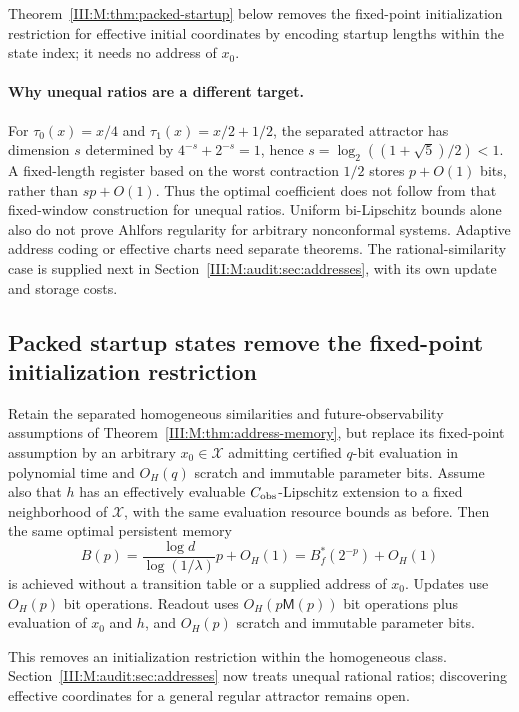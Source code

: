 Theorem~\ref{III:M:thm:packed-startup} below removes the fixed-point
initialization restriction for effective initial coordinates by encoding
startup lengths within the state index; it needs no address of $x_0$.

\paragraph{Why unequal ratios are a different target.}
For $\tau_0(x)=x/4$ and $\tau_1(x)=x/2+1/2$, the separated attractor
has dimension $s$ determined by $4^{-s}+2^{-s}=1$, hence
$s=\log_2((1+\sqrt5)/2)<1$.
A fixed-length register based on the worst contraction $1/2$ stores
$p+O(1)$ bits, rather than $sp+O(1)$. Thus the optimal
coefficient does not follow from that fixed-window construction for unequal ratios. Uniform bi-Lipschitz
bounds alone also do not prove Ahlfors regularity for arbitrary
nonconformal systems. Adaptive address coding or effective charts need separate theorems.
The rational-similarity case is supplied next in
Section~\ref{III:M:audit:sec:addresses}, with its own update and storage costs.

\subsection{Packed startup states remove the fixed-point initialization restriction}
\label{III:M:sec:packed-startup}
\begin{theorem}
\label{III:M:thm:packed-startup}
Retain the separated homogeneous similarities and future-observability
assumptions of Theorem~\ref{III:M:thm:address-memory}, but replace its
fixed-point assumption by an arbitrary $x_0\in\mathcal X$ admitting
certified $q$-bit evaluation in polynomial time and $O_H(q)$ scratch
and immutable parameter bits. Assume also that $h$ has an effectively
evaluable $C_{\rm obs}$-Lipschitz extension to a fixed neighborhood
of $\mathcal X$, with the same evaluation resource bounds as before.
Then the same optimal persistent memory
\[
 B(p)=\frac{\log d}{\log(1/\lambda)}p+O_H(1)
       =B_f^*(2^{-p})+O_H(1)
\]
is achieved without a transition table or a supplied address of $x_0$.
Updates use $O_H(p)$ bit operations. Readout uses
$O_H(p\mathsf M(p))$ bit operations plus evaluation of $x_0$ and $h$,
and $O_H(p)$ scratch and immutable parameter bits.
\end{theorem}

This removes an initialization restriction within the homogeneous
class. Section~\ref{III:M:audit:sec:addresses} now treats unequal rational
ratios; discovering effective coordinates for a general regular
attractor remains open.

